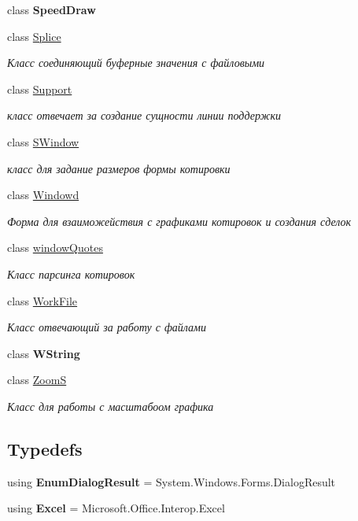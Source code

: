 \begin{DoxyCompactItemize}
class {\bfseries Speed\+Draw}
\item 
class \hyperlink{class_client_1_1_splice}{Splice}
\begin{DoxyCompactList}\small\item\em Класс соединяющий буферные значения с файловыми \end{DoxyCompactList}\item 
class \hyperlink{class_client_1_1_support}{Support}
\begin{DoxyCompactList}\small\item\em класс отвечает за создание сущности линии поддержки \end{DoxyCompactList}\item 
class \hyperlink{class_client_1_1_s_window}{S\+Window}
\begin{DoxyCompactList}\small\item\em класс для задание размеров формы котировки \end{DoxyCompactList}\item 
class \hyperlink{class_client_1_1_windowd}{Windowd}
\begin{DoxyCompactList}\small\item\em Форма для взаиможействия с графиками котировок и создания сделок \end{DoxyCompactList}\item 
class \hyperlink{class_client_1_1window_quotes}{window\+Quotes}
\begin{DoxyCompactList}\small\item\em Класс парсинга котировок \end{DoxyCompactList}\item 
class \hyperlink{class_client_1_1_work_file}{Work\+File}
\begin{DoxyCompactList}\small\item\em Класс отвечающий за работу с файлами \end{DoxyCompactList}\item 
class {\bfseries W\+String}
\item 
class \hyperlink{class_client_1_1_zoom_s}{ZoomS}
\begin{DoxyCompactList}\small\item\em Класс для работы с масштабоом графика \end{DoxyCompactList}\end{DoxyCompactItemize}
\subsection*{Typedefs}
\begin{DoxyCompactItemize}
\item 
\hypertarget{namespace_client_ae20e76d5488b468826600e98538df2a3}{}\label{namespace_client_ae20e76d5488b468826600e98538df2a3} 
using {\bfseries Enum\+Dialog\+Result} = System.\+Windows.\+Forms.\+Dialog\+Result
\item 
\hypertarget{namespace_client_aec74278014a479f235b75f6c96cb7529}{}\label{namespace_client_aec74278014a479f235b75f6c96cb7529} 
using {\bfseries Excel} = Microsoft.\+Office.\+Interop.\+Excel
\end{DoxyCompactItemize}
